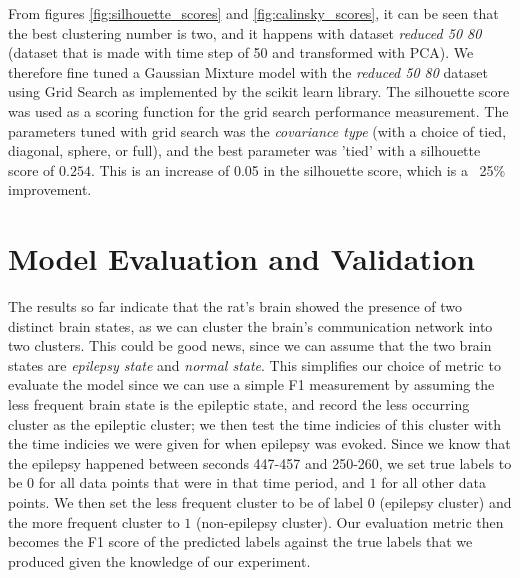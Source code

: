 \documentclass[journal,12pt,onecolumn,draftclsnofoot]{IEEEtran}  %
\begin{document}
From figures \ref{fig:silhouette_scores} and \ref{fig:calinsky_scores}, it can be seen that the best clustering number is two, and it happens with dataset \textit{reduced 50 80} (dataset that is made with time step of 50 and transformed with PCA). We therefore fine tuned a Gaussian Mixture model with the \textit{reduced 50 80} dataset using Grid Search as implemented by the scikit learn library. The silhouette score was used as a scoring function for the grid search performance measurement. The parameters tuned with grid search was the \textit{covariance type} (with a choice of tied, diagonal, sphere, or full), and the best parameter was 'tied' with a silhouette score of $0.254$. This is an increase of 0.05 in the silhouette score, which is a ~25\% improvement.



\section{Model Evaluation and Validation}
The results so far indicate that the rat's brain showed the presence of two distinct brain states, as we can cluster the brain's communication network into two clusters. This could be good news, since we can assume that the two brain states are \textit{epilepsy state} and \textit{normal state}. This simplifies our choice of metric to evaluate the model since we can use a simple F1 measurement by assuming the less frequent brain state is the epileptic state, and record the less occurring cluster as the epileptic cluster; we then test the time indicies of this cluster with the time indicies we were given for when epilepsy was evoked. Since we know that the epilepsy happened between seconds 447-457 and 250-260, we set true labels to be $0$ for all data points that were in that time period, and $1$ for all other data points. We then set the less frequent cluster to be of label $0$ (epilepsy cluster) and the more frequent cluster to $1$ (non-epilepsy cluster). Our evaluation metric then becomes the F1 score of the predicted labels against the true labels that we produced given the knowledge of our experiment.
\end{document}
